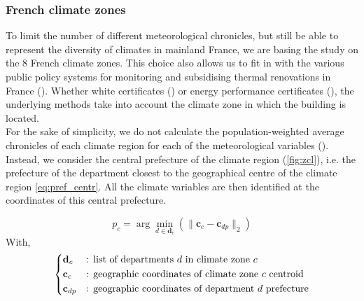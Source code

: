 \documentclass[11pt]{article}
\begin{document}

        \subsubsection{French climate zones} %
        \label{ssub:french_climate_zones}

        To limit the number of different meteorological chronicles, but still be able to represent the diversity of climates in mainland France, we are basing the study on the 8 French climate zones. This choice also allows us to fit in with the various public policy systems for monitoring and subsidising thermal renovations in France (\cite{anah_aides_2024}). Whether white certificates (\cite{ademe_french_2011}) or energy performance certificates (\cite{ministere_de_la_transition_ecologique_methode_2021}), the underlying methods take into account the climate zone in which the building is located. \\

        For the sake of simplicity, we do not calculate the population-weighted average chronicles of each climate region for each of the meteorological variables (\cite{cros_comparative_2025}). Instead, we consider the central prefecture of the climate region (\ref{fig:zcl}), i.e. the prefecture of the department closest to the geographical centre of the climate region \eqref{eq:pref_centr}. All the climate variables are then identified at the coordinates of this central prefecture. 

        \begin{equation}
            \label{eq:pref_centr}
            p_c = \arg \min_{d \in \mathbf{d}_c} \left(\|\mathbf{c}_c - \mathbf{c}_{dp}\|_2 \right)
        \end{equation}
        With,
        $$
        \begin{dcases}
            \mathbf{d}_c&\text{: list of departments $d$ in climate zone $c$}\\
            \mathbf{c}_c&\text{: geographic coordinates of climate zone $c$ centroid}\\
            \mathbf{c}_{dp}&\text{: geographic coordinates of department $d$ prefecture}\\
        \end{dcases}
        $$
\end{document}
